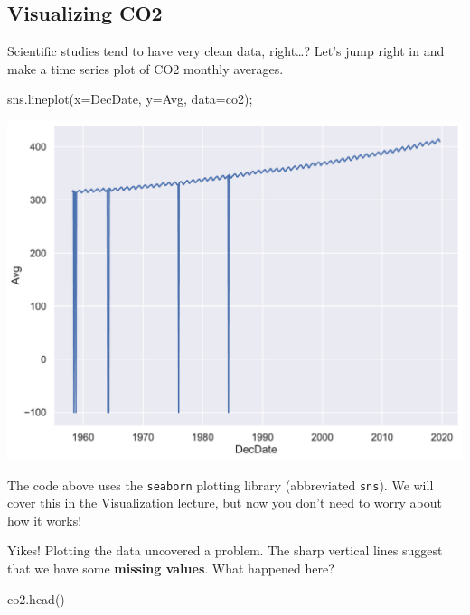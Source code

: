 \documentclass[
  letterpaper,
  DIV=11,
  numbers=noendperiod]{scrreprt}
\newenvironment{Shaded}{\begin{snugshade}}{\end{snugshade}}
\newcommand{\NormalTok}[1]{\textcolor[rgb]{0.00,0.23,0.31}{#1}}
\newcommand{\OperatorTok}[1]{\textcolor[rgb]{0.37,0.37,0.37}{#1}}
\newcommand{\StringTok}[1]{\textcolor[rgb]{0.13,0.47,0.30}{#1}}
\begin{document}
\subsection{Visualizing CO2}\label{visualizing-co2}

Scientific studies tend to have very clean data, right\ldots? Let's jump
right in and make a time series plot of CO2 monthly averages.

\begin{Shaded}
\begin{Highlighting}[]
\NormalTok{sns.lineplot(x}\OperatorTok{=}\StringTok{\textquotesingle{}DecDate\textquotesingle{}}\NormalTok{, y}\OperatorTok{=}\StringTok{\textquotesingle{}Avg\textquotesingle{}}\NormalTok{, data}\OperatorTok{=}\NormalTok{co2)}\OperatorTok{;}
\end{Highlighting}
\end{Shaded}

\includegraphics{eda/eda_files/figure-pdf/cell-62-output-1.pdf}

The code above uses the \texttt{seaborn} plotting library (abbreviated
\texttt{sns}). We will cover this in the Visualization lecture, but now
you don't need to worry about how it works!

Yikes! Plotting the data uncovered a problem. The sharp vertical lines
suggest that we have some \textbf{missing values}. What happened here?

\begin{Shaded}
\begin{Highlighting}[]
\NormalTok{co2.head()}
\end{Highlighting}
\end{Shaded}
\end{document}
